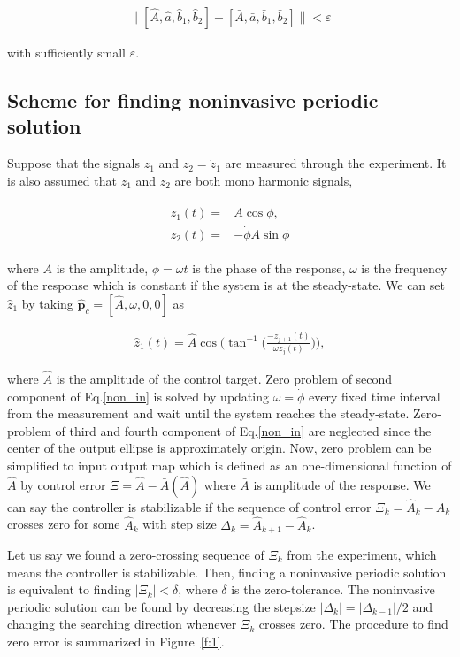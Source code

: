 \documentclass[openacc]{rsproca_new}%
\theoremstyle{own}
\def\epsilon{\varepsilon}
\def\vec#1{\ensuremath{\mathbf{#1}}}
\newcommand{\Fref}[1]{Figure~\ref{#1}}
\begin{document}
\begin{align}\label{non_in}
\|[\hat A,\hat a,\hat b_1,\hat b_2]-[\bar A,\bar a,\bar b_1,\bar b_2]\|<\epsilon
\end{align}

\noindent with sufficiently small $\epsilon$.

\subsection{Scheme for finding noninvasive periodic solution}\label{FNP}

Suppose that the signals $z_1$ and $z_2=\dot z_1$ are measured through the experiment. It is also assumed that $z_1$ and $z_2$ are both mono harmonic signals,

\begin{align}\label{eq:25}
\begin{split}
z_{1}(t)=&A\cos{\phi},\\
z_{2}(t)=&-\dot\phi A\sin{\phi}
\end{split}
\end{align}

\noindent where $A$ is the amplitude, $\phi=\omega t$ is the phase of the response, $\omega$ is the frequency of the response which is constant if the system is at the steady-state. We can set $\hat z_1$ by taking $\hat {\vec p}_c=[\hat A,\omega,0,0]$ as

\begin{align}\label{eq:26}
\hat z_1(t)=\hat A\cos\Big(\tan^{-1}\Big({\frac{-z_{j+1}(t)}{ \omega z_{j}(t)}}\Big) \Big),
\end{align}

\noindent where $\hat A$ is the amplitude of the control target. Zero problem of second component of Eq.\ref{non_in} is solved by updating $\omega=\dot\phi$ every fixed time interval from the measurement and wait until the system reaches the steady-state. Zero-problem of third and fourth component of Eq.\ref{non_in} are neglected since the center of the output ellipse is approximately origin. Now, zero problem can be simplified to input output map which is defined as an one-dimensional function of $\hat A$ by control error $\Xi=\hat A - \bar A(\hat A)$ where $\bar A$ is amplitude of the response. We can say the controller is stabilizable if the sequence of control error $\Xi_k=\hat A_k-A_k$ crosses zero for some $\hat A_k$ with step size $\Delta_k=\hat A_{k+1}-\hat A_{k}$.

Let us say we found a zero-crossing sequence of $\Xi_k$ from the experiment, which means the controller is stabilizable. Then, finding a noninvasive periodic solution is equivalent to finding  $|\Xi_k|<\delta$, where $\delta$ is the zero-tolerance. The noninvasive periodic solution can be found by decreasing the stepsize $|\Delta_k|=|\Delta_{k-1}|/2$ and changing the searching direction whenever $\Xi_k$ crosses zero. The procedure to find zero error is summarized in \Fref{f:1}.
\end{document}
